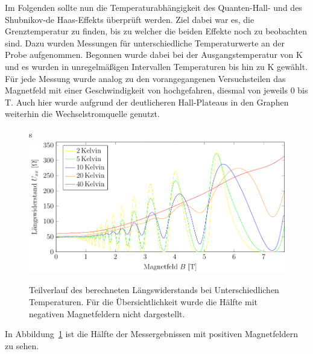 
Im Folgenden sollte nun die Temperaturabhängigkeit des Quanten-Hall- und des Shubnikov-de Haas-Effekts überprüft werden. Ziel dabei war es, die Grenztemperatur zu finden, bis zu welcher die beiden Effekte noch zu beobachten sind. 
Dazu wurden Messungen für unterschiedliche Temperaturwerte an der Probe aufgenommen. Begonnen wurde dabei bei der Ausgangstemperatur von \unit[2]{K} und es wurden in unregelmäßigen Intervallen Temperaturen bis hin zu \unit[40]{K} gewählt. Für jede Messung wurde analog zu den vorangegangenen Versuchsteilen das Magnetfeld mit einer Geschwindigkeit von  hochgefahren, diesmal von jeweils 0 bis \unit[7,7]{T}. Auch hier wurde aufgrund der deutlicheren Hall-Plateaus in den Graphen weiterhin die Wechselstromquelle genutzt.


\begin{figure}[h]
	\centering
s	\includegraphics[scale=1]{graphs/temperatur/full_range.pdf}
	\caption[Hall-Widerstand unter Temperaturvariation]{
		Teilverlauf des berechneten Längswiderstands bei Unterschiedlichen Temperaturen. Für die Übersichtlichkeit wurde die Hälfte mit negativen Magnetfeldern nicht dargestellt.
	}
	\label{fig:temp_mess}
\end{figure}

In Abbildung~\ref{fig:temp_mess} ist die Hälfte der Messergebnissen mit positiven Magnetfeldern zu sehen.